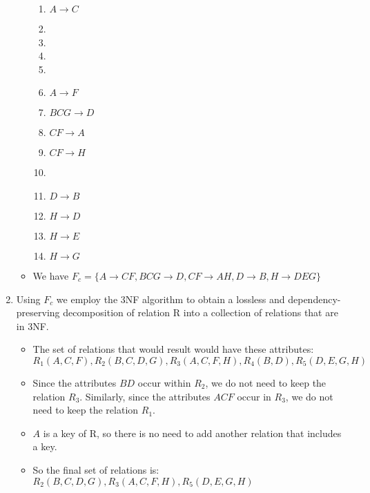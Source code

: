 \documentclass{homework}
\begin{document}
\begin{enumerate}[label=(\Alph*)]
\begin{itemize}
        \begin{enumerate}[label=\arabic*]
            \item $A\rightarrow C$
            \item 
            \item 
            \item 
            \item 
            \item $A\rightarrow F$
            \item $BCG\rightarrow D$
            \item $CF\rightarrow A$
            \item $CF\rightarrow H$
            \item 
            \item $D\rightarrow B$
            \item $H\rightarrow D$
            \item $H\rightarrow E$
            \item $H\rightarrow G$
        \end{enumerate}
        \item We have $F_c=\{A\rightarrow CF, BCG\rightarrow D, CF\rightarrow AH, D\rightarrow B, H\rightarrow DEG\}$
    \end{itemize}
    \item Using $F_c$ we employ the 3NF algorithm to obtain a lossless and dependency-preserving decomposition of relation R into a collection of relations that are in 3NF.
    \begin{itemize}
        \item The set of relations that would result would have these attributes:\\
        $R_1(A, C, F), R_2(B, C, D, G), R_3(A, C, F, H), R_4(B, D), R_5(D, E, G, H)$
        \item Since the attributes $BD$ occur within $R_2$, we do not need to keep the relation $R_3$. Similarly, since the attributes $ACF$ occur in $R_3$, we do not need to keep the relation $R_1$.
        \item $A$ is a key of R, so there is no need to add another relation that includes a key.
        \item So the final set of relations is:\\
        $R_2(B, C, D, G), R_3(A, C, F, H), R_5(D, E, G, H)$
    \end{itemize}
\end{enumerate}
\end{document}
